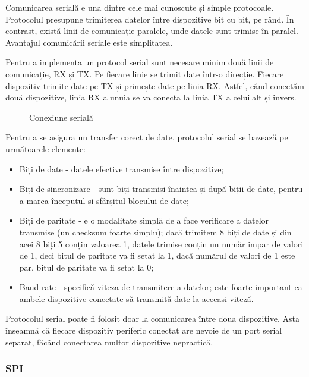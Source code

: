 Comunicarea serială e una dintre cele mai cunoscute și simple protocoale.
Protocolul presupune trimiterea datelor între dispozitive bit cu bit, pe rând.
În contrast, există linii de comunicație paralele, unde datele sunt trimise în
paralel. Avantajul comunicării seriale este simplitatea.

Pentru a implementa un protocol serial sunt necesare minim două linii de
comunicație, RX și TX. Pe fiecare linie se trimit date într-o direcție. Fiecare
dispozitiv trimite date pe TX și primește date pe linia RX. Astfel, când
conectăm două dispozitive, linia RX a unuia se va conecta la linia TX a
celuilalt și invers.

\begin{figure}[htbp]
	\centering
	\def\svgwidth{\columnwidth}
	
	\caption{Conexiune serială}
	\label{fig:embed-serial}
\end{figure}

Pentru a se asigura un transfer corect de date, protocolul serial se bazează pe
următoarele elemente:

\begin{itemize}
	\item Biți de date - datele efective transmise între dispozitive;
	\item Biți de sincronizare - sunt biți transmiși înaintea și după biții
		de date, pentru a marca începutul și sfârșitul blocului de date;
	\item Biți de paritate - e o modalitate simplă de a face verificare a
		datelor transmise (un checksum foarte simplu); dacă trimitem 8
		biți de date și din acei 8 biți 5 conțin valoarea 1, datele
		trimise conțin un număr impar de valori de 1, deci bitul de
		paritate va fi setat la 1, dacă numărul de valori de 1 este par,
		bitul de paritate va fi setat la 0;
	\item Baud rate - specifică viteza de transmitere a datelor; este foarte
		important ca ambele dispozitive conectate să transmită date la
		aceeași viteză.
\end{itemize}

Protocolul serial poate fi folosit doar la comunicarea între doua dispozitive.
Asta înseamnă că fiecare dispozitiv periferic conectat are nevoie de un port
serial separat, făcând conectarea multor dispozitive nepractică.

\subsubsection{SPI}
\label{sec:embed-bus-wire-serial}

